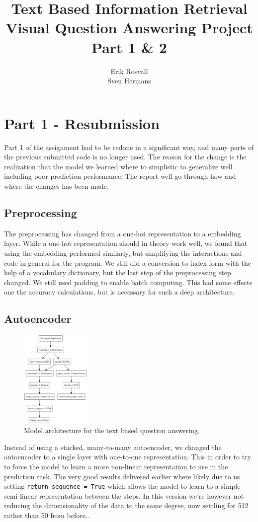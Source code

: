 \documentclass[10pt,a4paper]{report}
\author{Erik Rosvall \\ Sven Hermans}
\title{Text Based Information Retrieval \\ Visual Question Answering Project \\ Part 1 \& 2}
\begin{document}
	\maketitle
	\section*{Part 1 - Resubmission}
		Part 1 of the assignment had to be redone in a significant way, and many parts of the previous submitted code is no longer used. The reason for the change is the realization that the model we learned where to simplistic to generalize well including poor prediction performance. The report well go through how and where the changes has been made.
	\subsection*{Preprocessing}
		The preprocessing has changed from a one-hot representation to a embedding layer. While a one-hot representation should in theory work well, we found that using the embedding performed similarly, but simplifying the interactions and code in general for the program. We still did a conversion to index form with the help of a vocabulary dictionary, but the last step of the preprocessing step changed. We still used padding to enable batch computing. This had some effects one the accuracy calculations, but is necessary for such a deep architecture.
	\subsection*{Autoencoder}
		\begin{figure}
		\begin{center}
			\includegraphics[width=0.3\textwidth]{text_classifier_w_autoencoder.png}
		\end{center}
		\caption{Model architecture for the text based question answering. \label{text_classifier_w_autoencoder}}
	\end{figure}
	Instead of using a stacked, many-to-many autoencoder, we changed the autoencoder to a single layer with one-to-one representation. This in order to try to force the model to learn a more non-linear representation to use in the prediction task. The very good results delivered earlier where likely due to us setting \texttt{return\_sequence = True} which allows the model to learn to a simple semi-linear  representation between the steps. In this version we're however not reducing the dimensionality of the data to the same degree, now settling for 512 rather than 50 from before..
\end{document}
